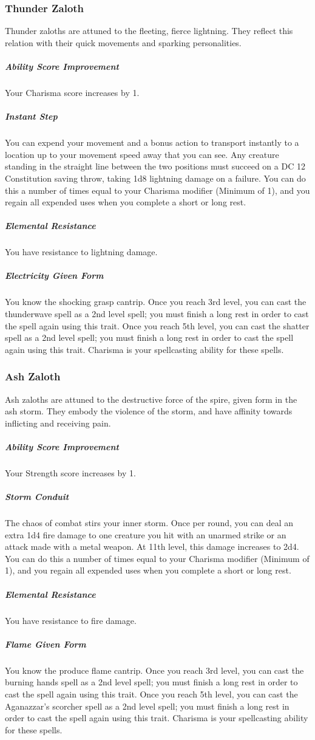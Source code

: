\begin{linenumbers}
\subsubsection{Thunder Zaloth}
Thunder zaloths are attuned to the fleeting, fierce lightning.
They reflect this relation with their quick movements and sparking personalities.
\subparagraph{Ability Score Improvement} Your Charisma score increases by 1.
\subparagraph{Instant Step} You can expend your movement and a bonus action to transport instantly to a location up to your movement speed away that you can see.
Any creature standing in the straight line between the two positions must succeed on a DC 12 Constitution saving throw, taking 1d8 lightning damage on a failure.
You can do this a number of times equal to your Charisma modifier (Minimum of 1), and you regain all expended uses when you complete a short or long rest.
\subparagraph{Elemental Resistance} You have resistance to lightning damage.
\subparagraph{Electricity Given Form} You know the shocking grasp cantrip.
Once you reach 3rd level, you can cast the thunderwave spell as a 2nd level spell; you must finish a long rest in order to cast the spell again using this trait.
Once you reach 5th level, you can cast the shatter spell as a 2nd level spell; you must finish a long rest in order to cast the spell again using this trait.
Charisma is your spellcasting ability for these spells.

\subsubsection{Ash Zaloth}
Ash zaloths are attuned to the destructive force of the spire, given form in the ash storm.
They embody the violence of the storm, and have affinity towards inflicting and receiving pain.
\subparagraph{Ability Score Improvement} Your Strength score increases by 1.
\subparagraph{Storm Conduit} The chaos of combat stirs your inner storm.
Once per round, you can deal an extra 1d4 fire damage to one creature you hit with an unarmed strike or an attack made with a metal weapon.
At 11th level, this damage increases to 2d4.
You can do this a number of times equal to your Charisma modifier (Minimum of 1), and you regain all expended uses when you complete a short or long rest.
\subparagraph{Elemental Resistance} You have resistance to fire damage.
\subparagraph{Flame Given Form} You know the produce flame cantrip.
Once you reach 3rd level, you can cast the burning hands spell as a 2nd level spell; you must finish a long rest in order to cast the spell again using this trait.
Once you reach 5th level, you can cast the Aganazzar's scorcher spell as a 2nd level spell; you must finish a long rest in order to cast the spell again using this trait.
Charisma is your spellcasting ability for these spells.


\end{linenumbers}
